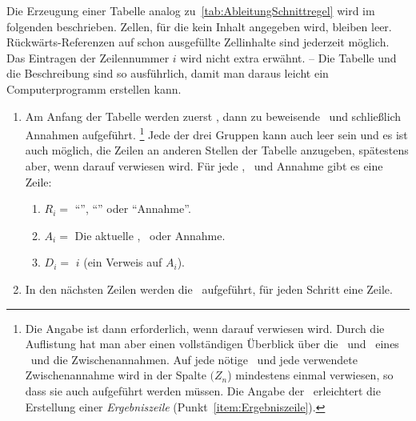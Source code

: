 {Die Erzeugung einer Tabelle analog zu~\vref{tab:AbleitungSchnittregel} wird im folgenden beschrieben.
Zellen, für die kein Inhalt angegeben wird, bleiben leer.
Rückwärts-Referenzen auf schon ausgefüllte Zellinhalte sind jederzeit möglich.
Das Eintragen der Zeilennummer $i$ wird nicht extra erwähnt.
-- Die Tabelle und die Beschreibung sind so ausführlich, damit man daraus leicht ein Computerprogramm erstellen kann.
%
\begin{enumerate}
	\item Am Anfang der Tabelle werden zuerst \Voraussetzungen, dann zu beweisende \Folgerungen\ und schließlich Annahmen aufgeführt.%
	\footnote{%
		Die Angabe ist dann erforderlich, wenn darauf verwiesen wird.
		Durch die Auflistung hat man aber einen vollständigen Überblick über die \Voraussetzungen\ und \Folgerungen\ eines \Beweises\ und die Zwischenannahmen.
		Auf jede nötige \Voraussetzung\ und jede verwendete Zwischenannahme wird in der Spalte $(Z_n$) mindestens einmal verwiesen, so dass sie auch aufgeführt werden müssen.
		Die Angabe der \Folgerungen\ erleichtert die Erstellung einer \emph{Ergebniszeile} (\seename Punkt~\ref{item:Ergebniszeile}).
	}
	Jede der drei Gruppen kann auch leer sein und es ist auch möglich, die Zeilen an anderen Stellen der Tabelle anzugeben, spätestens aber, wenn darauf verwiesen wird.
	Für jede \Voraussetzung, \Folgerung\ und Annahme gibt es eine Zeile:
	\begin{enumerate}
		\item $R_i =$ \enquote{\Voraussetzung}, \enquote{\Folgerung} oder \enquote{Annahme}.
		\item $A_i =$ Die aktuelle \Voraussetzung, \Folgerung\ oder Annahme.
		\item $D_i =$ $i$ \quad (ein Verweis auf $A_i$).
	\end{enumerate}
	\item In den nächsten Zeilen werden die \Beweisschritte\ aufgeführt, für jeden Schritt eine Zeile.


\end{enumerate}}
